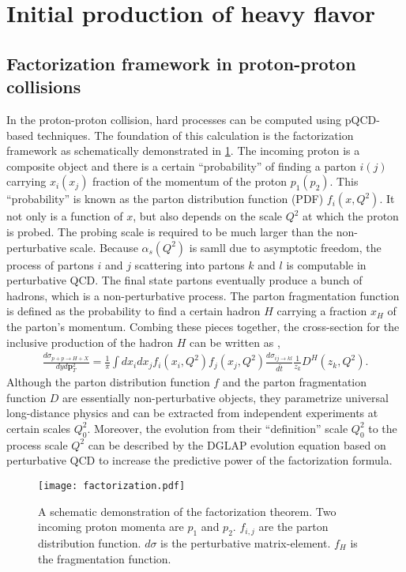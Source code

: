\section{Initial production of heavy flavor}
\label{section:hard}
\subsection{Factorization framework in proton-proton collisions}
In the proton-proton collision, hard processes can be computed using pQCD-based techniques.
The foundation of this calculation is the factorization framework as schematically demonstrated in \ref{fig:factorization}.
The incoming proton is a composite object and there is a certain ``probability'' of finding a parton $i(j)$ carrying $x_i(x_j)$ fraction of the momentum of the proton $p_1(p_2)$.
This ``probability'' is known as the parton distribution function (PDF) $f_i(x, Q^2)$.
It not only is a function of $x$, but also depends on the scale $Q^2$ at which the proton is probed.
The probing scale is required to be much larger than the non-perturbative scale.
Because $\alpha_s(Q^2)$ is samll due to asymptotic freedom, the process of partons $i$ and $j$ scattering into partons $k$ and $l$ is computable in perturbative QCD.
The final state partons eventually produce a bunch of hadrons, which is a non-perturbative process.
The parton fragmentation function is defined as the probability to find a certain hadron $H$ carrying a fraction $x_H$ of the parton's momentum.
Combing these pieces together, the cross-section for the inclusive production of the hadron $H$ can be written as \cite{Field:1989uq},
\begin{eqnarray}
\frac{d\sigma_{p+p\rightarrow H+X}}{dy d\mathbf{p}_T^2} = \frac{1}{\pi}\int dx_i dx_j f_i(x_i, Q^2) f_j(x_j, Q^2) \frac{d\sigma_{ij\rightarrow kl}}{d\hat{t}} \frac{1}{z_k}D^H(z_k, Q^2).
\end{eqnarray}
Although the parton distribution function $f$ and the parton fragmentation function $D$ are essentially non-perturbative objects, they parametrize universal long-distance physics and can be extracted from independent experiments at certain scales $Q_0^2$.
Moreover, the evolution from their ``definition'' scale $Q_0^2$ to the process scale $Q^2$ can be described by the DGLAP evolution equation \cite{Gribov:1972ri,Altarelli:1977zs,Dokshitzer:1977sg} based on perturbative QCD to increase the predictive power of the factorization formula.

\begin{figure}
\centering
\texttt{[image: factorization.pdf]}
\caption{A schematic demonstration of the factorization theorem. Two incoming proton momenta are $p_1$ and $p_2$. $f_{i,j}$ are the parton distribution function. $d\sigma$ is the perturbative matrix-element. $f_H$ is the fragmentation function.}
\label{fig:factorization}
\end{figure}

